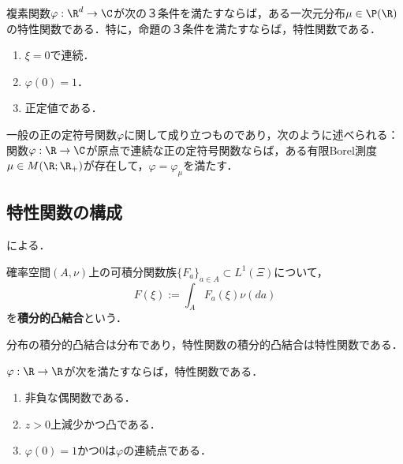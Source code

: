 \documentclass[uplatex,dvipdfmx]{jsreport}
\begin{document}
\begin{theorem}[Bochner]\label{thm-Bochner}
    複素関数$\varphi:\R^d\to\C$が次の３条件を満たすならば，ある一次元分布$\mu\in\P(\R)$の特性関数である．特に，命題の３条件を満たすならば，特性関数である．
    \begin{enumerate}
        \item $\xi=0$で連続．
        \item $\varphi(0)=1$．
        \item 正定値である．
    \end{enumerate}
\end{theorem}
\begin{remarks}
    一般の正の定符号関数$\varphi$に関して成り立つものであり，次のように述べられる：
    関数$\varphi:\R\to\C$が原点で連続な正の定符号関数ならば，ある有限Borel測度$\mu\in M(\R;\R_+)$が存在して，$\varphi=\varphi_\mu$を満たす．
\end{remarks}

\subsection{特性関数の構成}

\begin{tcolorbox}[colframe=ForestGreen, colback=ForestGreen!10!white,breakable,colbacktitle=ForestGreen!40!white,coltitle=black,fonttitle=\bfseries\sffamily,
title=]
    \cite{伊藤清確率論}による．
\end{tcolorbox}

\begin{definition}
    確率空間$(A,\nu)$上の可積分関数族$\{F_a\}_{a\in A}\subset L^1(\Xi)$について，
    \[F(\xi):=\int_AF_a(\xi)\nu(da)\]
    を\textbf{積分的凸結合}という．
\end{definition}

\begin{theorem}
    分布の積分的凸結合は分布であり，特性関数の積分的凸結合は特性関数である．
\end{theorem}

\begin{theorem}[Polya]
    $\varphi:\R\to\R$が次を満たすならば，特性関数である．
    \begin{enumerate}
        \item 非負な偶関数である．
        \item $z>0$上減少かつ凸である．
        \item $\varphi(0)=1$かつ$0$は$\varphi$の連続点である．
    \end{enumerate}
\end{theorem}
\end{document}
